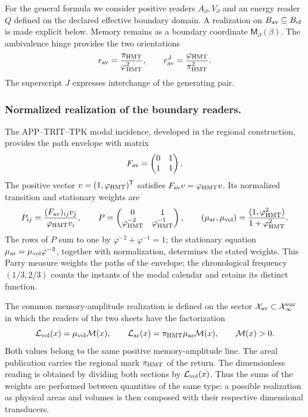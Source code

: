 For the general formula we consider positive readers
\(A_\partial,V_\partial\) and an energy reader \(Q\)
defined on the declared effective boundary domain.
A realization on
\(B_{\rm av}\subseteq B_{\rm ef}\) is made explicit below. Memory remains as a boundary
coordinate \(\mathsf M_\partial(\beta)\). The ambivalence
hinge provides the two orientations
\[
 r_{\rm av}=\frac{\pi_{\rm HMT}}{\varphi_{\rm HMT}^2},\qquad
 r_{\rm av}^{J}=\frac{\varphi_{\rm HMT}}{\pi_{\rm HMT}^2}.
\]
The superscript \(J\) expresses interchange of the generating pair.
\subsubsection{Normalized realization of the boundary readers.}
The APP--TRIT--TPK modal incidence, developed in the regional
construction, provides the path envelope with matrix
\[
 F_{\rm av}=\begin{pmatrix}0&1\\1&1\end{pmatrix}.
\]
The positive vector \(v=(1,\varphi_{\rm HMT})^{\mathsf T}\)
satisfies \(F_{\rm av}v=\varphi_{\rm HMT}v\). Its normalized
transition and stationary weights are
\begin{equation}
 P_{ij}=\frac{(F_{\rm av})_{ij}v_j}{\varphi_{\rm HMT}v_i},
 \qquad
 P=\begin{pmatrix}0&1\\
 \varphi_{\rm HMT}^{-2}&\varphi_{\rm HMT}^{-1}\end{pmatrix},
 \qquad
 (\mu_{\rm ar},\mu_{\rm vol})
 =\frac{(1,\varphi_{\rm HMT}^{2})}{1+\varphi_{\rm HMT}^{2}}.
 \label{x_reciprocidad:vii:eq:lectores-parry}
\end{equation}
The rows of \(P\) sum to one by
\(\varphi^{-2}+\varphi^{-1}=1\); the stationary equation
\(\mu_{\rm ar}=\mu_{\rm vol}\varphi^{-2}\), together with
normalization, determines the stated weights. This Parry measure
weights the paths of the envelope; the chronological frequency
\((1/3,2/3)\) counts the instants of the modal calendar and retains
its distinct function.

The common memory-amplitude realization is defined on the sector
\(\mathcal X_{\rm av}\subset\mathcal X_\infty^{\rm enr}\) in which
the readers of the two sheets have the factorization
\begin{equation}
 \mathcal L_{\rm vol}(x)=\mu_{\rm vol}\mathcal M(x),\qquad
 \mathcal L_{\rm ar}(x)=\pi_{\rm HMT}\mu_{\rm ar}\mathcal M(x),
 \qquad \mathcal M(x)>0.
 \label{x_reciprocidad:vii:eq:lectores-amplitud-comun}
\end{equation}
Both values belong to the same positive memory-amplitude
line. The areal publication carries the regional mark
\(\pi_{\rm HMT}\) of the return. The dimensionless reading is obtained
by dividing both sections by \(\mathcal L_{\rm vol}(x)\).
Thus the sums of the weights are performed between quantities of the
same type; a possible realization as physical areas and volumes
is then composed with their respective dimensional transducers.


